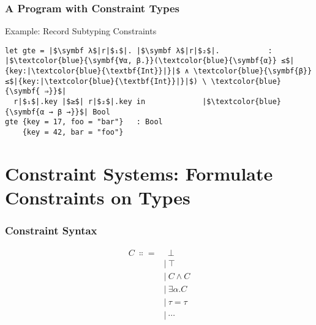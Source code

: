 \documentclass[aspectratio=169]{beamer}
\begin{document}
\begingroup
\large
\begin{frame}[fragile]
  \frametitle{A Program with Constraint Types}
  \begin{center}
    \begin{block}{Example: Record Subtyping Constraints}
      \begin{verbatim}
let gte = |$\symbf λ$|r|$₁$|. |$\symbf λ$|r|$₂$|.           : |$\textcolor{blue}{\symbf{∀α, β.}}(\textcolor{blue}{\symbf{α}} ≤$|{key:|\textcolor{blue}{\textbf{Int}}|}|$ ∧ \textcolor{blue}{\symbf{β}} ≤$|{key:|\textcolor{blue}{\textbf{Int}}|}|$) \ \textcolor{blue}{\symbf{ ⇒}}$|
  r|$₁$|.key |$≥$| r|$₂$|.key in             |$\textcolor{blue}{\symbf{α → β →}}$| Bool
gte {key = 17, foo = "bar"}   : Bool
    {key = 42, bar = "foo"}
          \end{verbatim}
    \end{block}
  \end{center}
\end{frame}
\endgroup

\section{Constraint Systems: Formulate Constraints on Types}

\begingroup
\Large
\begin{frame}[fragile]
  \frametitle{Constraint Syntax}
  \begin{align*}
    C \ ∷= & \ \ ⊥     \\
           & | \ ⊤     \\
           & | \ C ∧ C \\
           & | \ ∃α. C \\
           & | \ τ = τ \\
           & | \ ⋯
  \end{align*}
\end{frame}
\endgroup
\end{document}
